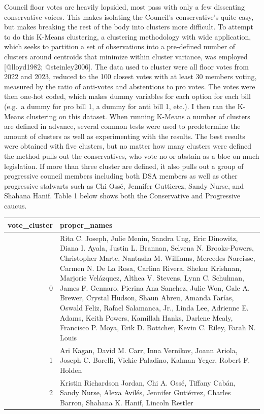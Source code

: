 \documentclass[
  letterpaper,
  DIV=11,
  numbers=noendperiod]{scrartcl}
\begin{document}
Council floor votes are heavily lopsided, most pass with only a few
dissenting conservative voices. This makes isolating the Council's
conservative's quite easy, but makes breaking the rest of the body into
clusters more difficult. To attempt to do this K-Means clustering, a
clustering methodology with wide application, which seeks to partition a
set of observations into a pre-defined number of clusters around
centroids that minimize within cluster variance, was employed
{[}@lloyd1982; @steinley2006{]}. The data used to cluster were all floor
votes from 2022 and 2023, reduced to the 100 closest votes with at least
30 members voting, measured by the ratio of anti-votes and abstentions
to pro votes. The votes were then one-hot coded, which makes dummy
variables for each option for each bill (e.g.~a dummy for pro bill 1, a
dummy for anti bill 1, etc.). I then ran the K-Means clustering on this
dataset. When running K-Means a number of clusters are defined in
advance, several common tests were used to predetermine the amount of
clusters as well as experimenting with the results. The best results
were obtained with five clusters, but no matter how many clusters were
defined the method pulls out the conservatives, who vote no or abstain
as a bloc on much legislation. If more than three cluster are defined,
it also pulls out a group of progressive council members including both
DSA members as well as other progressive stalwarts such as Chi Ossé,
Jennifer Guttierez, Sandy Nurse, and Shahana Hanif. Table 1 below shows
both the Conservative and Progressive caucus.

\begin{longtable}{rl}
\toprule
vote\_cluster & proper\_names \\ 
\midrule
0 & Rita C. Joseph, Julie Menin, Sandra Ung, Eric Dinowitz, Diana I. Ayala, Justin L. Brannan, Selvena N. Brooks-Powers, Christopher Marte, Nantasha M. Williams, Mercedes Narcisse, Carmen N. De La Rosa, Carlina Rivera, Shekar Krishnan, Marjorie Velázquez, Althea V.  Stevens, Lynn C. Schulman, James F. Gennaro, Pierina Ana Sanchez, Julie Won, Gale A. Brewer, Crystal Hudson, Shaun Abreu, Amanda Farías, Oswald Feliz, Rafael Salamanca, Jr., Linda Lee, Adrienne E. Adams, Keith Powers, Kamillah Hanks, Darlene Mealy, Francisco P. Moya, Erik D. Bottcher, Kevin C. Riley, Farah N. Louis \\ 
1 & Ari Kagan, David M. Carr, Inna Vernikov, Joann Ariola, Joseph C. Borelli, Vickie Paladino, Kalman Yeger, Robert F. Holden \\ 
2 & Kristin Richardson Jordan, Chi A. Ossé, Tiffany Cabán, Sandy Nurse, Alexa Avilés, Jennifer Gutiérrez, Charles Barron, Shahana K. Hanif, Lincoln Restler \\ 
\bottomrule
\end{longtable}
\end{document}
